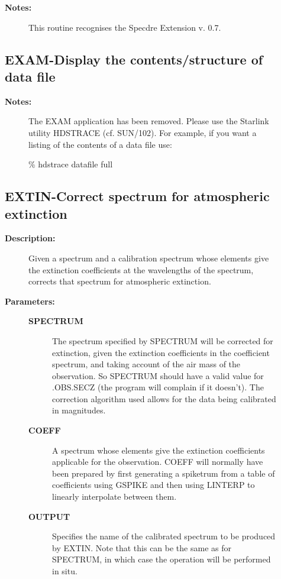 \begin{description}
\begin{description}
\begin{terminalv}
\end{terminalv}

\item [\textbf{Notes:}]
This routine recognises the Specdre Extension v. 0.7.
\end{description}
\subsection{EXAM-\label{EXAM}Display the contents/structure of data file}
\begin{description}

\item [\textbf{Notes:}]
 The EXAM application has been removed. Please use the Starlink utility
 HDSTRACE (cf. SUN/102).  For example, if you want a listing of the
 contents of a data file use:

    \% hdstrace datafile full
\end{description}
\subsection{EXTIN-\label{EXTIN}Correct spectrum for atmospheric extinction}
\begin{description}

\item [\textbf{Description:}]
 Given a spectrum and a calibration spectrum whose elements give
 the extinction coefficients at the wavelengths of the spectrum,
 corrects that spectrum for atmospheric extinction.

\item [\textbf{Parameters:}]
\begin{description}
\item [\textbf{SPECTRUM}]
 The spectrum specified by SPECTRUM will be corrected
 for extinction, given the extinction coefficients in
 the coefficient spectrum, and taking account of the air
 mass of the observation.  So SPECTRUM should have a
 valid value for .OBS.SECZ (the program will complain
 if it doesn't).  The correction algorithm used allows
 for the data being calibrated in magnitudes.
\item [\textbf{COEFF}]
 A spectrum whose elements give the extinction
 coefficients applicable for the observation.  COEFF will
 normally have been prepared by first generating a spiketrum
 from a table of coefficients using GSPIKE and then using
 LINTERP to linearly interpolate between them.
\item [\textbf{OUTPUT}]
 Specifies the name of the calibrated spectrum to be produced
 by EXTIN.  Note that this can be the same as for SPECTRUM,
 in which case the operation will be performed in situ.
\end{description}


\end{description}
\end{description}
